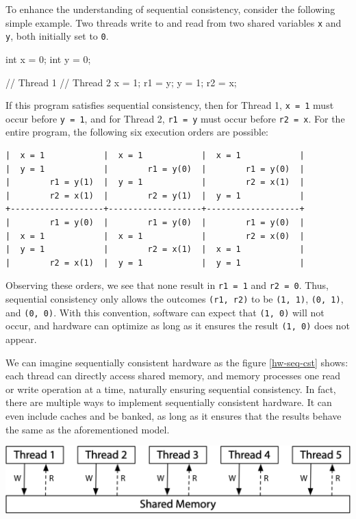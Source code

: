 \documentclass[fontsize=10pt, oneside]{scrartcl}
\newcommand{\monobox}[1]{\mbox{\texttt{#1}}}
\begin{document}
To enhance the understanding of sequential consistency, consider the following simple example. Two threads write to and read from two shared variables \monobox{x} and \monobox{y}, both initially set to \monobox{0}.

\begin{ccode}
int x = 0;
int y = 0;

// Thread 1        // Thread 2
x = 1;             r1 = y;
y = 1;             r2 = x;
\end{ccode}

If this program satisfies sequential consistency, then for Thread 1, \monobox{x = 1} must occur before \monobox{y = 1}, and for Thread 2, \monobox{r1 = y} must occur before \monobox{r2 = x}. For the entire program, the following six execution orders are possible:

\begin{verbatim}
|  x = 1            |  x = 1            |  x = 1            |
|  y = 1            |        r1 = y(0)  |        r1 = y(0)  |
|        r1 = y(1)  |  y = 1            |        r2 = x(1)  |
|        r2 = x(1)  |        r2 = y(1)  |  y = 1            |
+-------------------+-------------------+-------------------+
|        r1 = y(0)  |        r1 = y(0)  |        r1 = y(0)  |
|  x = 1            |  x = 1            |        r2 = x(0)  |
|  y = 1            |        r2 = x(1)  |  x = 1            |
|        r2 = x(1)  |  y = 1            |  y = 1            |
\end{verbatim}

Observing these orders, we see that none result in \monobox{r1 = 1} and \monobox{r2 = 0}. Thus, sequential consistency only allows the outcomes \monobox{(r1, r2)} to be \monobox{(1, 1)}, \monobox{(0, 1)}, and \monobox{(0, 0)}. With this convention, software can expect that \monobox{(1, 0)} will not occur, and hardware can optimize as long as it ensures the result \monobox{(1, 0)} does not appear.

We can imagine sequentially consistent hardware as the figure \ref{hw-seq-cst} shows: each thread can directly access shared memory, and memory processes one read or write operation at a time, naturally ensuring sequential consistency. In fact, there are multiple ways to implement sequentially consistent hardware. It can even include caches and be banked, as long as it ensures that the results behave the same as the aforementioned model.

\centering
\includegraphics[keepaspectratio,width=0.7\linewidth]{images/hw-seq-cst}
\label{hw-seq-cst}
\end{document}

